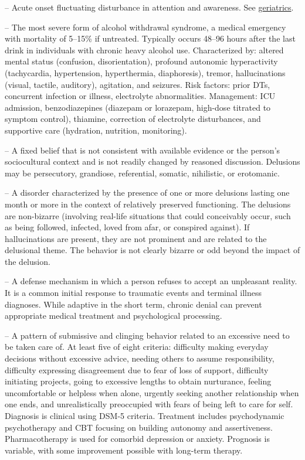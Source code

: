 -- Acute onset fluctuating disturbance in attention and awareness. See \hyperlink{Geriatrics}{geriatrics}.

-- The most severe form of alcohol withdrawal syndrome, a medical emergency with mortality of 5--15\% if untreated. Typically occurs 48--96 hours after the last drink in individuals with chronic heavy alcohol use. Characterized by: altered mental status (confusion, disorientation), profound autonomic hyperactivity (tachycardia, hypertension, hyperthermia, diaphoresis), tremor, hallucinations (visual, tactile, auditory), agitation, and seizures. Risk factors: prior DTs, concurrent infection or illness, electrolyte abnormalities. Management: ICU admission, benzodiazepines (diazepam or lorazepam, high-dose titrated to symptom control), thiamine, correction of electrolyte disturbances, and supportive care (hydration, nutrition, monitoring).

-- A fixed belief that is not consistent with available evidence or the person’s sociocultural context and is not readily changed by reasoned discussion. Delusions may be persecutory, grandiose, referential, somatic, nihilistic, or erotomanic.

-- A disorder characterized by the presence of one or more delusions lasting one month or more in the context of relatively preserved functioning. The delusions are non-bizarre (involving real-life situations that could conceivably occur, such as being followed, infected, loved from afar, or conspired against). If hallucinations are present, they are not prominent and are related to the delusional theme. The behavior is not clearly bizarre or odd beyond the impact of the delusion.

-- A defense mechanism in which a person refuses to accept an unpleasant reality. It is a common initial response to traumatic events and terminal illness diagnoses. While adaptive in the short term, chronic denial can prevent appropriate medical treatment and psychological processing.

-- A pattern of submissive and clinging behavior related to an excessive need to be taken care of. At least five of eight criteria: difficulty making everyday decisions without excessive advice, needing others to assume responsibility, difficulty expressing disagreement due to fear of loss of support, difficulty initiating projects, going to excessive lengths to obtain nurturance, feeling uncomfortable or helpless when alone, urgently seeking another relationship when one ends, and unrealistically preoccupied with fears of being left to care for self. Diagnosis is clinical using DSM-5 criteria. Treatment includes psychodynamic psychotherapy and CBT focusing on building autonomy and assertiveness. Pharmacotherapy is used for comorbid depression or anxiety. Prognosis is variable, with some improvement possible with long-term therapy.

